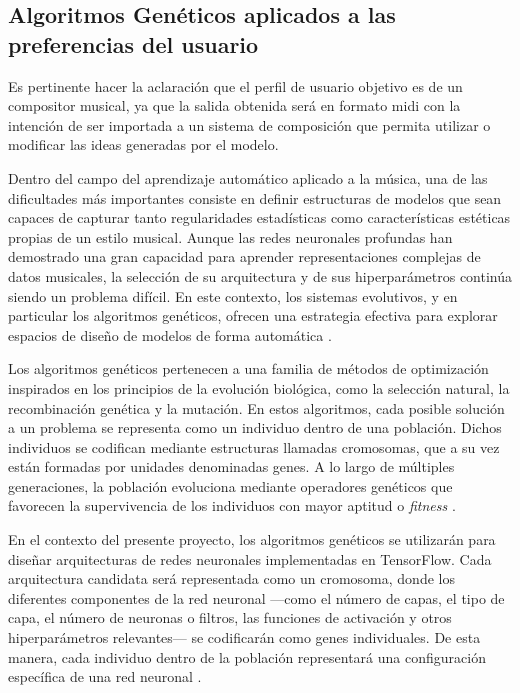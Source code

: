 \documentclass[12pt]{report}
\begin{document}
\subsection{Algoritmos Genéticos aplicados a las preferencias del usuario}

Es pertinente hacer la aclaración que el perfil de usuario objetivo es de un compositor musical, ya que la salida obtenida será en formato midi con la intención de ser importada a un sistema de composición que permita utilizar o modificar las ideas generadas por el modelo.

Dentro del campo del aprendizaje automático aplicado a la música, una de las dificultades más importantes consiste en definir estructuras de modelos que sean capaces de capturar tanto regularidades estadísticas como características estéticas propias de un estilo musical. Aunque las redes neuronales profundas han demostrado una gran capacidad para aprender representaciones complejas de datos musicales, la selección de su arquitectura y de sus hiperparámetros continúa siendo un problema difícil. En este contexto, los sistemas evolutivos, y en particular los algoritmos genéticos, ofrecen una estrategia efectiva para explorar espacios de diseño de modelos de forma automática \cite{liu2017hierarchical}.

Los algoritmos genéticos pertenecen a una familia de métodos de optimización inspirados en los principios de la evolución biológica, como la selección natural, la recombinación genética y la mutación. En estos algoritmos, cada posible solución a un problema se representa como un individuo dentro de una población. Dichos individuos se codifican mediante estructuras llamadas cromosomas, que a su vez están formadas por unidades denominadas genes. A lo largo de múltiples generaciones, la población evoluciona mediante operadores genéticos que favorecen la supervivencia de los individuos con mayor aptitud o \textit{fitness} \cite{holland1992adaptation}.

En el contexto del presente proyecto, los algoritmos genéticos se utilizarán para diseñar arquitecturas de redes neuronales implementadas en TensorFlow. Cada arquitectura candidata será representada como un cromosoma, donde los diferentes componentes de la red neuronal —como el número de capas, el tipo de capa, el número de neuronas o filtros, las funciones de activación y otros hiperparámetros relevantes— se codificarán como genes individuales. De esta manera, cada individuo dentro de la población representará una configuración específica de una red neuronal \cite{stanley2019designing}.
\end{document}
